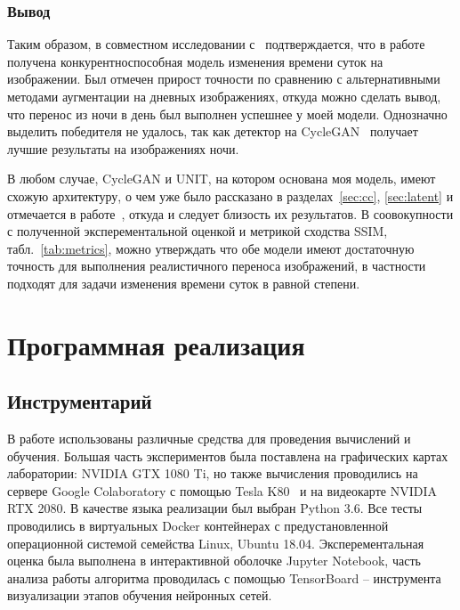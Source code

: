 \documentclass[11pt,a4paper]{extarticle}
\begin{document}
{			\begin{table}
				
			\end{table}
			
			\subsubsection*{Вывод}
			
				Таким образом, в совместном исследовании с~\cite{disser_aug} подтверждается, что в работе получена конкурентноспособная модель изменения времени суток на изображении.
				Был отмечен прирост точности по сравнению с альтернативными методами аугментации на дневных изображениях, откуда можно сделать вывод, что перенос из ночи в день был выполнен успешнее у моей модели.
				Однозначно выделить победителя не удалось, так как детектор на CycleGAN~\cite{CycleGAN} получает лучшие результаты на изображениях ночи.
				
				В любом случае, CycleGAN и UNIT, на котором основана моя модель, имеют схожую архитектуру, о чем уже было рассказано в разделах~\ref{sec:cc}, \ref{sec:latent} и отмечается в работе~\cite{UNIT_vs_CycleGAN}, откуда и следует близость их результатов.
				В соовокупности с полученной эксперементальной оценкой и метрикой сходства SSIM, табл.~\ref{tab:metrics}, можно утверждать что обе модели имеют достаточную точность для выполнения реалистичного переноса изображений, в частности подходят для задачи изменения времени суток в равной степени.

\newpage
\section{Программная реализация}\label{sec:prac}

	\subsection{Инструментарий}\label{sec:tools}

		В работе использованы различные средства для проведения вычислений и обучения.
		Большая часть экспериментов была поставлена на графических картах лаборатории: NVIDIA GTX 1080 Ti, но также вычисления проводились на сервере Google Colaboratory с помощью Tesla K80~\cite{colab} и на видеокарте NVIDIA RTX 2080.
		В качестве языка реализации был выбран Python 3.6.
		Все тесты проводились в виртуальных Docker контейнерах с предустановленной операционной системой семейства Linux, Ubuntu 18.04.
		Эксперементальная оценка была выполнена в интерактивной оболочке Jupyter Notebook, часть анализа работы алгоритма проводилась с помощью TensorBoard -- инструмента визуализации этапов обучения нейронных сетей.

}
\end{document}
